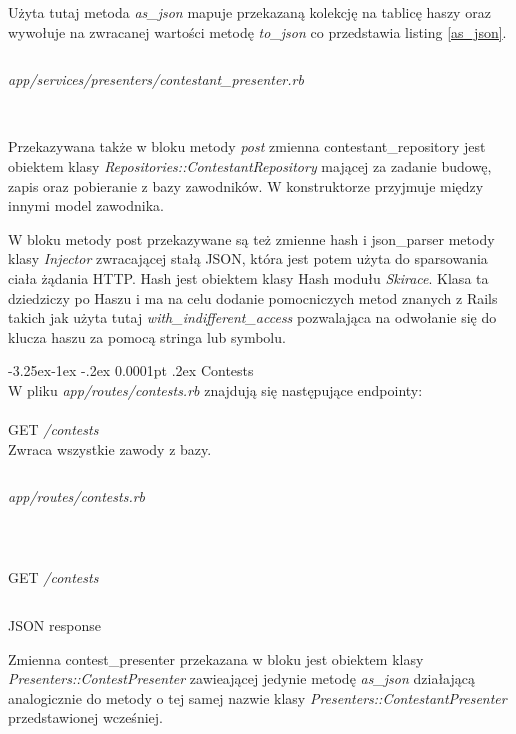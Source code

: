 \documentclass[11pt,a4paper, twoside]{article}
\makeatletter
\renewcommand\subparagraph{\@startsection{subparagraph}{5}{\z@}%
                                     {-3.25ex\@plus -1ex \@minus -.2ex}%
                                     {0.0001pt \@plus .2ex}%
                                     {\normalfont\normalsize\bfseries}}
\makeatother
\begin{document}
Użyta tutaj metoda \emph{as\_json} mapuje przekazaną kolekcję na tablicę haszy oraz wywołuje na zwracanej wartości metodę \emph{to\_json} co przedstawia listing \ref{as_json}.
\begin{listing}
\inputminted{ruby}{./src/contestants_as_json.rb}
\caption{\emph{app/services/presenters/contestant\_presenter.rb}}
$\label{as_json}$
\end{listing}


Przekazywana także w bloku metody \emph{post} zmienna contestant\_repository jest obiektem klasy \emph{Repositories::ContestantRepository} mającej za zadanie budowę, zapis oraz pobieranie z bazy zawodników. W konstruktorze przyjmuje między innymi model zawodnika. %

W bloku metody post przekazywane są też zmienne hash i json\_parser metody klasy \emph{Injector} zwracającej stałą JSON, która jest potem użyta do sparsowania ciała żądania HTTP. Hash jest obiektem klasy Hash modułu \emph{Skirace}. Klasa ta dziedziczy po Haszu i ma na celu dodanie pomocniczych metod znanych z Rails takich jak użyta tutaj \emph{with\_indifferent\_access} pozwalająca na odwołanie się do klucza haszu za pomocą stringa lub symbolu. 

\clearpage
\subparagraph{Contests} ~\\
W pliku \emph{app/routes/contests.rb} znajdują się następujące endpointy:
\\\\
GET \emph{/contests}
\\
\noindent
Zwraca wszystkie zawody z bazy.
\begin{listing}
\inputminted{ruby}{./src/get_contests.rb}
\caption{\emph{app/routes/contests.rb}}
$\label{contests}$
\end{listing}
\begin{listing}
\inputminted{ruby}{./src/curl_contests}
\caption{GET \emph{/contests}}
\end{listing}
\begin{listing}
\inputminted{ruby}{./src/curl_contests_resp}
\caption{JSON response}
\end{listing}
Zmienna contest\_presenter przekazana w bloku jest obiektem klasy \emph{Presenters::ContestPresenter} zawieającej jedynie metodę \emph{as\_json} działającą analogicznie do metody o tej samej nazwie klasy \emph{Presenters::ContestantPresenter} przedstawionej wcześniej.
\end{document}
